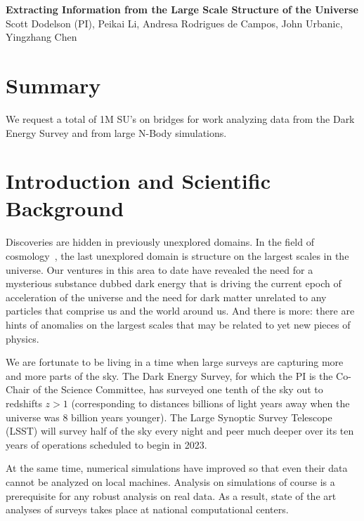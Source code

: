 \documentclass[12pt]{article}
\begin{document}
\topmargin=-2.105cm
\oddsidemargin=-0.1cm
\evensidemargin=0cm

\begin{center}
{\bf Extracting Information from the Large Scale Structure of the Universe\\}
Scott Dodelson (PI), Peikai Li, Andresa Rodrigues de Campos, John Urbanic, Yingzhang Chen
\end{center}

\begin{small}


\section*{Summary} We request a total of 1M SU's on bridges for work analyzing data from the Dark Energy Survey and from large N-Body simulations.

\section{Introduction and Scientific Background}

Discoveries are hidden in previously unexplored domains. In the field of cosmology~\cite{Dodelson:2003ft}, the last unexplored domain is structure on the largest scales in the universe. Our ventures in this area to date have revealed the need for a mysterious substance dubbed dark energy that is driving the current epoch of acceleration of the universe and the need for dark matter unrelated to any particles that comprise us and the world around us. And there is more: there are hints of anomalies on the largest scales that may be related to yet new pieces of physics. 

We are fortunate to be living in a time when large surveys are capturing more and more parts of the sky. The Dark Energy Survey, for which the PI is the Co-Chair of the Science Committee, has surveyed one tenth of the sky out to redshifts $z>1$ (corresponding to distances billions of light years away when the universe was 8 billion years younger). The Large Synoptic Survey Telescope (LSST) will survey half of the sky every night and peer much deeper over its ten years of operations scheduled to begin in 2023. 

At the same time, numerical simulations have improved so that even their data cannot be analyzed on local machines. Analysis on simulations of course is a prerequisite for any robust analysis on real data. As a result, state of the art analyses of surveys takes place at national computational centers.


\end{small}
\end{document}
